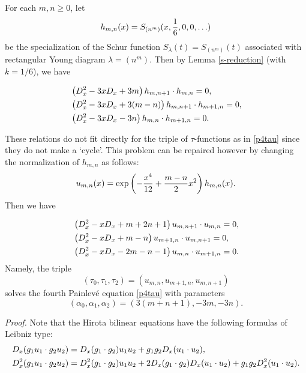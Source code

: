 For each $m,n\ge 0$, let 
\begin{equation}
h_{m,n}(x)=S_{(n^m)}(x,{1 \over 6},0,0,\ldots)
\end{equation}
be the specialization of the Schur function 
$S_{\lambda}(t)=S_{(n^m)}(t)$ 
associated with rectangular Young diagram $\lambda=(n^m)$.
Then by Lemma \ref{s-reduction} (with $k=1/6$), we have
\begin{lem}
\begin{align}
&\left( D_x^2-3 x D_x+3m \right) h_{m,n+1} \cdot h_{m,n}=0, \notag \\
&\left( D_x^2-3 x D_x+3(m-n) \right) h_{m,n+1} \cdot h_{m+1,n}=0, \\
&\left( D_x^2-3 x D_x-3n \right) h_{m,n} \cdot h_{m+1,n}=0. \notag
\end{align}
\end{lem}
These relations do not fit directly for the triple of 
$\tau$-functions as in \eqref{p4tau} 
since they do not make a `cycle'. 
This problem can be repaired however by changing the normalization of 
$h_{m,n}$ as follows: 
\begin{equation}
u_{m,n}(x)=\exp \left(-{x^4 \over 12}+{m-n \over 2}x^2 \right) h_{m,n}(x).
\end{equation}
Then we have 
\begin{prop}\label{PropHer}
\begin{align}\label{ueq}
&\left( D_x^2-x D_x+m+2n+1 \right) u_{m,n+1} \cdot u_{m,n}=0, \notag \\
&\left( D_x^2-x D_x+m-n \right) u_{m+1,n} \cdot u_{m,n+1}=0, \\
&\left( D_x^2-x D_x-2m-n-1 \right) u_{m,n} \cdot u_{m+1,n}=0. \notag
\end{align}
Namely, the triple 
\begin{equation}
(\tau_0,\tau_1,\tau_2)=(u_{m,n},u_{m+1,n},u_{m,n+1})
\end{equation}
solves the fourth Painlev\'e equation \eqref{p4tau} with parameters
\begin{equation}
(\alpha_0,\alpha_1,\alpha_2)=(3(m+n+1),-3 m,-3n).
\end{equation}
\end{prop}
\par\noindent
{\em Proof.} \quad
Note that the Hirota bilinear equations have the following 
formulas of Leibniz type: 
\begin{align}
&D_x(g_1 u_1 \cdot g_2 u_2)=
D_x (g_1 \cdot g_2) u_1 u_2+g_1 g_2 D_x(u_1 \cdot u_2), \notag \\
&D_x^2 (g_1 u_1 \cdot g_2 u_2)=
D_x^2 (g_1 \cdot g_2) u_1 u_2+2 D_x(g_1 \cdot g_2) D_x(u_1 \cdot u_2)+
g_1 g_2 D_x^2(u_1 \cdot u_2).\notag
\end{align}
